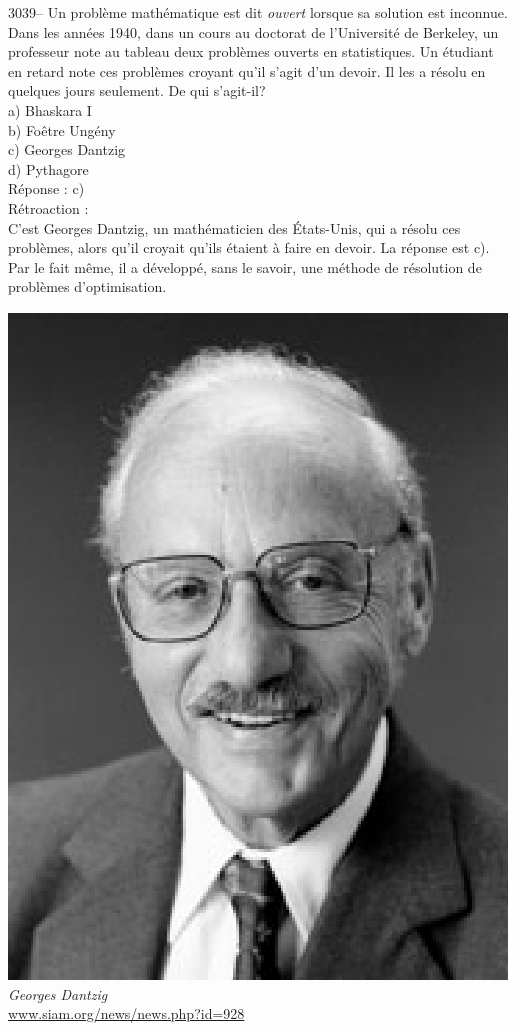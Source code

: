 \documentclass[letterpaper, 12pt]{article}
\begin{document}
3039-- Un probl\`eme math\'ematique est dit \emph{ouvert} lorsque sa solution est inconnue.\\
Dans les ann\'ees 1940, dans un cours au doctorat de l'Universit\'e de Berkeley, un professeur note au tableau deux probl\`emes ouverts en statistiques. Un \'etudiant en retard note ces probl\`emes croyant qu'il s'agit d'un devoir. Il les a r\'esolu en quelques jours seulement. De qui s'agit-il?\\

a) Bhaskara I\ier{}\\
b) Fo\^etre Ung\'eny\\
c) Georges Dantzig\\
d) Pythagore\\

R\'eponse : c)\\

R\'etroaction :\\
C'est Georges Dantzig, un math\'ematicien des \'Etats-Unis, qui a r\'esolu ces probl\`emes, alors qu'il croyait qu'ils \'etaient \`a faire en devoir. La r\'eponse est c). Par le fait m\^eme, il a d\'evelopp\'e, sans le savoir, une m\'ethode de r\'esolution de probl\`emes d'optimisation.\\

\begin{center}
\includegraphics[scale=0.3]{dantzig.eps}\\
\emph{{\small Georges Dantzig}}\\
\href{http://www.siam.org/news/news.php?id=928}{www.siam.org/news/news.php?id=928}\\[5mm]
\end{center}
\end{document}
